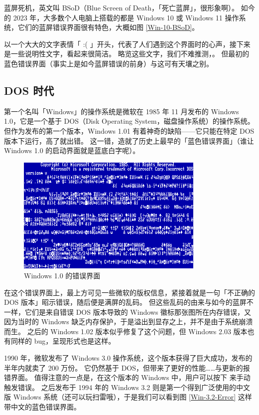 蓝屏死机，英文叫 BSoD（Blue Screen of Death，「死亡蓝屏」，很形象啊）。
如今的 2023 年，大多数个人电脑上搭载的都是 Windows 10 或 Windows 11 操作系统，它们的蓝屏错误界面很有特色，大概如图 \ref{Win-10-BSoD}。

以一个大大的文字表情「 :( 」开头，代表了人们遇到这个界面时的心声，接下来是一些说明性文字，看起来很简洁。
略览这些文字，我们不难推测，。
但最初的蓝色错误界面（事实上是如今蓝屏错误的前身）与这可有天壤之别。

\subsection{DOS 时代}

第一个名叫「Windows」的操作系统是微软在 1985 年 11 月发布的 Windows 1.0，它是一个基于 DOS（Disk Operating System，磁盘操作系统）的操作系统。
但作为发布的第一个版本，Windows 1.01 有着神奇的缺陷——它只能在特定 DOS 版本下运行，高了就出错。
这一错，造就了历史上最早的「蓝色错误界面」（谁让 Windows 1.0 的启动界面就是蓝底白字呢）。

\begin{figure}[htb!]
  \centering
  \includegraphics[width=9cm]{assets/Win-1.0-Error.png}
  \caption{Windows 1.0 的错误界面}
  \label{Win-1.0-Error}
\end{figure}

在这个错误界面上，最上方可见一些微软的版权信息，紧接着就是一句「不正确的 DOS 版本」昭示错误，随后便是满屏的乱码。
但这些乱码的由来与如今的蓝屏不一样，它们是来自错误 DOS 版本导致的 Windows 徽标那张图所在内存错误，又因为当时的 Windows 缺乏内存保护，于是溢出到显存之上，并不是由于系统崩溃而生。
之后的 Windows 1.02 版本似乎修复了这个问题，但 Windows 2.03 版本也有同样的 bug，呈现形式也是这样。

1990 年，微软发布了 Windows 3.0 操作系统，这个版本获得了巨大成功，发布的半年内就卖了 200 万份。
它仍然基于 DOS，但带来了更好的性能……与更新的报错界面。
值得注意的一点是，在这个版本的 Windows 中，用户可以按下  来手动触发错误。
之后发布于 1994 年的 Windows 3.2 则是第一个得到广泛使用的中文版 Windows 系统（还可以玩扫雷哦），于是我们可以看到图 \ref{Win-3.2-Error} 这样带中文的蓝色错误界面。

